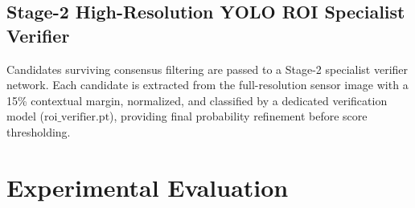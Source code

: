 \subsection{Stage-2 High-Resolution YOLO ROI Specialist Verifier}
Candidates surviving consensus filtering are passed to a Stage-2 specialist verifier network. Each candidate is extracted from the full-resolution sensor image with a 15\% contextual margin, normalized, and classified by a dedicated verification model ($\text{roi\_verifier.pt}$), providing final probability refinement before score thresholding.

\section{Experimental Evaluation}
\label{sec:experiments}


